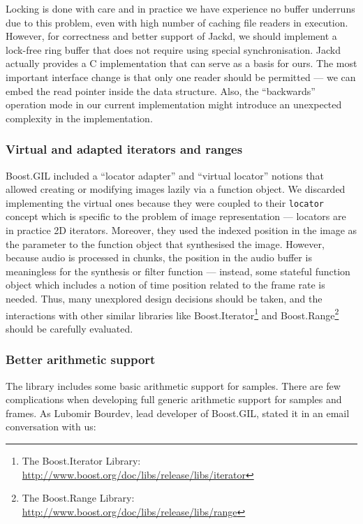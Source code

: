 Locking is done with care and in practice we have experience no buffer
underruns due to this problem, even with high number of caching file
readers in execution.  However, for correctness and better support of
Jackd, we should implement a lock-free ring buffer
\cite{valois94lock, michael95correction} that does not require
using special synchronisation. Jackd actually provides a C
implementation that can serve as a basis for ours. The most important
interface change is that only one reader should be permitted --- we
can embed the read pointer inside the data structure. Also, the
``backwards'' operation mode in our current implementation might
introduce an unexpected complexity in the implementation.

\subsubsection{Virtual and adapted iterators and ranges}
\label{sec:fixsynth}

Boost.GIL included a ``locator adapter'' and ``virtual locator''
notions that allowed creating or modifying images lazily via a
function object. We discarded implementing the virtual ones because
they were coupled to their \texttt{locator} concept which is specific
to the problem of image representation --- locators are in practice 2D
iterators. Moreover, they used the indexed position in the image as
the parameter to the function object that synthesised the
image. However, because audio is processed in chunks, the position in
the audio buffer is meaningless for the synthesis or filter function
--- instead, some stateful function object which includes a notion of
time position related to the frame rate is needed. Thus, many
unexplored design decisions should be taken, and the interactions with
other similar libraries like Boost.Iterator\footnote{The
  Boost.Iterator Library:
  \url{http://www.boost.org/doc/libs/release/libs/iterator}} and
Boost.Range\footnote{The Boost.Range Library:
  \url{http://www.boost.org/doc/libs/release/libs/range}} should be
carefully evaluated.

\subsubsection{Better arithmetic support}

The library includes some basic arithmetic support for samples. There
are few complications when developing full generic arithmetic support
for samples and frames. As Lubomir Bourdev, lead developer of
Boost.GIL, stated it in an email conversation with us:

